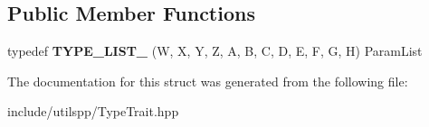 \subsection*{Public Member Functions}
\begin{DoxyCompactItemize}
\item 
\hypertarget{structutilspp_1_1PointerOnFunction_3_01V_07_5_08_07W_00_01X_00_01Y_00_01Z_00_01A_00_01B_00_01C_0aa55322b0a01a25603f55328f88cca8b_ab5a13173f766977d1abc2570586da3da}{typedef {\bfseries T\-Y\-P\-E\-\_\-\-L\-I\-S\-T\-\_} (W, X, Y, Z, A, B, C, D, E, F, G, H) Param\-List}\label{structutilspp_1_1PointerOnFunction_3_01V_07_5_08_07W_00_01X_00_01Y_00_01Z_00_01A_00_01B_00_01C_0aa55322b0a01a25603f55328f88cca8b_ab5a13173f766977d1abc2570586da3da}

\end{DoxyCompactItemize}


The documentation for this struct was generated from the following file\-:\begin{DoxyCompactItemize}
\item 
include/utilspp/Type\-Trait.\-hpp\end{DoxyCompactItemize}

